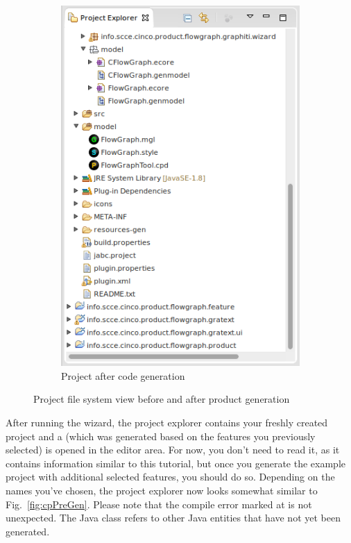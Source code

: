 \documentclass[a4paper,american,12pt]{scrreprt}
\begin{document}
\begin{figure}
\begin{subfigure}[t]{0.40\textwidth}
		\includegraphics[width=\textwidth]{screenshots/example-cp-postgen.png}
		\caption{Project after code generation}
		\label{fig:cpPostGen}
	\end{subfigure}
	\caption{Project file system view before and after \cinco{} product generation}
\end{figure}

After running the wizard, the project explorer contains your freshly created
project and a  (which was generated based on the features you
previously selected) is opened in the editor area. For now, you don't need to read it,
as it contains information similar to this tutorial, but once you generate the example
project with additional selected features, you should do so.
Depending on the names you've chosen, the project explorer now looks somewhat
similar to Fig.~\ref{fig:cpPreGen}. Please note that the compile error marked at
 is not unexpected. The Java class refers to
other Java entities that have not yet been generated. 
\end{document}
